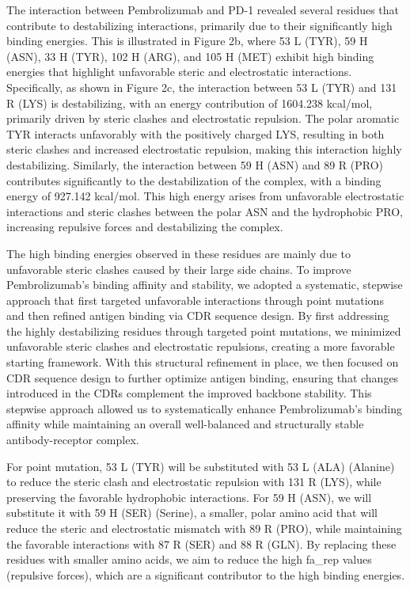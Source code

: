 \documentclass[11pt]{article}
\begin{document}
The interaction between Pembrolizumab and PD-1 revealed several residues that contribute to destabilizing interactions, primarily due to their significantly high binding energies. This is illustrated in Figure 2b, where 53 L (TYR), 59 H (ASN), 33 H (TYR), 102 H (ARG), and 105 H (MET) exhibit high binding energies that highlight unfavorable steric and electrostatic interactions. Specifically, as shown in Figure 2c, the interaction between 53 L (TYR) and 131 R (LYS) is destabilizing, with an energy contribution of 1604.238 kcal/mol, primarily driven by steric clashes and electrostatic repulsion. The polar aromatic TYR interacts unfavorably with the positively charged LYS, resulting in both steric clashes and increased electrostatic repulsion, making this interaction highly destabilizing. Similarly, the interaction between 59 H (ASN) and 89 R (PRO) contributes significantly to the destabilization of the complex, with a binding energy of 927.142 kcal/mol. This high energy arises from unfavorable electrostatic interactions and steric clashes between the polar ASN and the hydrophobic PRO, increasing repulsive forces and destabilizing the complex.

The high binding energies observed in these residues are mainly due to unfavorable steric clashes caused by their large side chains. To improve Pembrolizumab’s binding affinity and stability, we adopted a systematic, stepwise approach that first targeted unfavorable interactions through point mutations and then refined antigen binding via CDR sequence design. By first addressing the highly destabilizing residues through targeted point mutations, we minimized unfavorable steric clashes and electrostatic repulsions, creating a more favorable starting framework. With this structural refinement in place, we then focused on CDR sequence design to further optimize antigen binding, ensuring that changes introduced in the CDRs complement the improved backbone stability. This stepwise approach allowed us to systematically enhance Pembrolizumab’s binding affinity while maintaining an overall well-balanced and structurally stable antibody-receptor complex.

For point mutation, 53 L (TYR) will be substituted with 53 L (ALA) (Alanine) to reduce the steric clash and electrostatic repulsion with 131 R (LYS), while preserving the favorable hydrophobic interactions. For 59 H (ASN), we will substitute it with 59 H (SER) (Serine), a smaller, polar amino acid that will reduce the steric and electrostatic mismatch with 89 R (PRO), while maintaining the favorable interactions with 87 R (SER) and 88 R (GLN). By replacing these residues with smaller amino acids, we aim to reduce the high fa\_rep values (repulsive forces), which are a significant contributor to the high binding energies. 
\end{document}
